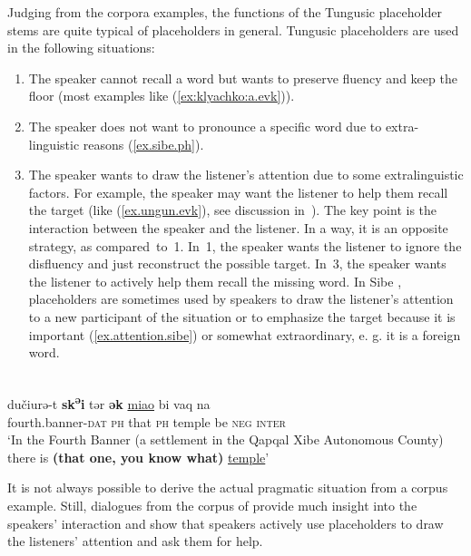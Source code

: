\documentclass[output=paper,colorlinks,citecolor=brown
\ChapterDOI{10.5281/zenodo.15697577}
]{langscibook}
\begin{document}
Judging from the corpora examples, the functions of the Tungusic placeholder stems are quite typical of placeholders in general. Tungusic placeholders are used in the following situations:
\begin{enumerate}
\item{The speaker cannot recall a word but wants to preserve fluency and keep the floor (most examples like (\ref{ex:klyachko:a.evk})).}
\item{The speaker does not want to pronounce a specific word due to extra-linguistic reasons (\ref{ex.sibe.ph}).}
\item{The speaker wants to draw the listener's attention due to some extralinguistic factors. For example, the speaker may want the listener to help them recall the target (like (\ref{ex.ungun.evk}), see discussion in~\citet[216]{klyachko2022}). The key point is the interaction between the speaker and the listener. In a way, it is an opposite strategy, as compared~to~1. In~1, the speaker wants the listener to ignore the disfluency and just reconstruct the possible target. In~3, the speaker wants the listener to actively help them recall the missing word. In Sibe \citep[106, 111]{zikmundova2013spoken}, placeholders are sometimes used by speakers to draw the listener's attention to a new participant of the situation or to emphasize the target because it is important (\ref{ex.attention.sibe}) or somewhat extraordinary, e. g. it is a foreign word}.
\end{enumerate}


 \ea \label{ex.attention.sibe}
 \\
 \gll dučiurə-t \textbf{sk\textsuperscript{ə}i} tər \textbf{ək} \uline{miao} bi vaq na\\
fourth.banner-\textsc{dat} \textsc{ph} that \textsc{ph} temple be \textsc{neg} \textsc{inter}\\
\glt `In the Fourth Banner (a settlement in the Qapqal Xibe Autonomous County) there is \textbf{(that one, you know what)} \uline{temple}' \\
 \z
{}

It is not always possible to derive the actual pragmatic situation from a corpus example. Still, dialogues from the corpus of \citet{EvenkiCorpusSiberianLang} provide much insight into the speakers' interaction and show that speakers actively use placeholders to draw the listeners' attention and ask them for help.
\end{document}
